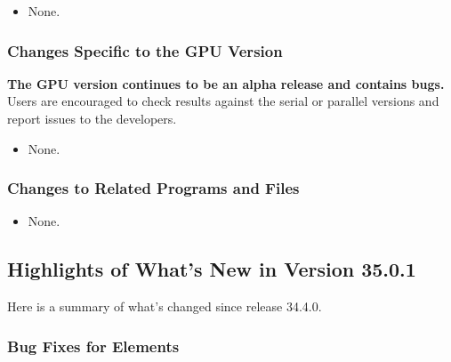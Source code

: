 \documentclass[11pt]{article}
\begin{document}
\begin{itemize}
\item None.
\end{itemize}

\subsubsection{Changes Specific to the GPU Version}

{\bf The GPU version continues to be an alpha release and contains bugs.}
Users are encouraged to check results against the serial or parallel versions and report issues to the developers.

\begin{itemize}
\item None.
\end{itemize}

\subsubsection{Changes to Related Programs and Files}

\begin{itemize}
\item None.
\end{itemize}

\subsection{Highlights of What's New in Version 35.0.1}

Here is a summary of what's changed since release 34.4.0.

\subsubsection{Bug Fixes for Elements}
\end{document}
